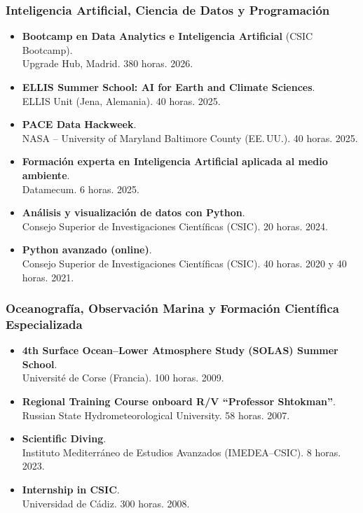 \documentclass[11pt,a4paper]{article}
\begin{document}
\subsubsection{Inteligencia Artificial, Ciencia de Datos y Programación}

\begin{itemize}[leftmargin=*]

    \item \textbf{Bootcamp en Data Analytics e Inteligencia Artificial} (CSIC Bootcamp).\\
    Upgrade Hub, Madrid. 380 horas. 2026.
    
    \item \textbf{ELLIS Summer School: AI for Earth and Climate Sciences}.\\
    ELLIS Unit (Jena, Alemania). 40 horas. 2025.

    \item \textbf{PACE Data Hackweek}.\\
    NASA -- University of Maryland Baltimore County (EE.\,UU.). 40 horas. 2025.

    \item \textbf{Formación experta en Inteligencia Artificial aplicada al medio ambiente}.\\
    Datamecum. 6 horas. 2025.

    \item \textbf{Análisis y visualización de datos con Python}.\\
    Consejo Superior de Investigaciones Científicas (CSIC). 20 horas. 2024.

    \item \textbf{Python avanzado (online)}.\\
    Consejo Superior de Investigaciones Científicas (CSIC). 40 horas. 2020 y 40 horas. 2021.
\end{itemize}

\subsubsection{Oceanografía, Observación Marina y Formación Científica Especializada}

\begin{itemize}[leftmargin=*]
    \item \textbf{4th Surface Ocean--Lower Atmosphere Study (SOLAS) Summer School}.\\
    Université de Corse (Francia). 100 horas. 2009.

    \item \textbf{Regional Training Course onboard R/V ``Professor Shtokman''}.\\
    Russian State Hydrometeorological University. 58 horas. 2007.

    \item \textbf{Scientific Diving}.\\
    Instituto Mediterráneo de Estudios Avanzados (IMEDEA--CSIC). 8 horas. 2023.

    \item \textbf{Internship in CSIC}.\\
    Universidad de Cádiz. 300 horas. 2008.
\end{itemize}
\end{document}
